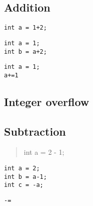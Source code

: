 

\subsection{Addition}

\begin{verbatim}
int a = 1+2;
\end{verbatim}

\begin{verbatim}
int a = 1;
int b = a+2;
\end{verbatim}

\begin{verbatim}
int a = 1;
a+=1
\end{verbatim}

\subsection{Integer overflow}


\subsection{Subtraction}

\begin{quote}
int a = 2 - 1;
\end{quote}

\begin{verbatim}
int a = 2;
int b = a-1;
int c = -a;
\end{verbatim}

\begin{verbatim}
-=
\end{verbatim}



